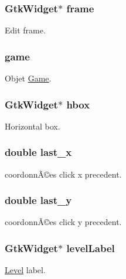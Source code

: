 \subsubsection[{\texorpdfstring{frame}{frame}}]{\setlength{\rightskip}{0pt plus 5cm}Gtk\+Widget$\ast$ frame}\hypertarget{struct_mydata_aa96506ac11851965d0f25b0c9eb53885}{}\label{struct_mydata_aa96506ac11851965d0f25b0c9eb53885}
Edit frame. 
\subsubsection[{\texorpdfstring{game}{game}}]{ game}\hypertarget{struct_mydata_ac6a5ed6191fcf3a5bf0445921feb4f48}{}\label{struct_mydata_ac6a5ed6191fcf3a5bf0445921feb4f48}
Objet \hyperlink{struct_game}{Game}. 
\subsubsection[{\texorpdfstring{hbox}{hbox}}]{\setlength{\rightskip}{0pt plus 5cm}Gtk\+Widget$\ast$ hbox}\hypertarget{struct_mydata_a1eed6d0ed7438018e0d938fce66d265d}{}\label{struct_mydata_a1eed6d0ed7438018e0d938fce66d265d}
Horizontal box. 
\subsubsection[{\texorpdfstring{last\+\_\+x}{last_x}}]{\setlength{\rightskip}{0pt plus 5cm}double last\+\_\+x}\hypertarget{struct_mydata_abb66b33c1e9a8a118c99e73d77ed512c}{}\label{struct_mydata_abb66b33c1e9a8a118c99e73d77ed512c}
coordonnÃ©es click x precedent. 
\subsubsection[{\texorpdfstring{last\+\_\+y}{last_y}}]{\setlength{\rightskip}{0pt plus 5cm}double last\+\_\+y}\hypertarget{struct_mydata_a58471f12beade2e129004d30fe0892c1}{}\label{struct_mydata_a58471f12beade2e129004d30fe0892c1}
coordonnÃ©es click y precedent. 
\subsubsection[{\texorpdfstring{level\+Label}{levelLabel}}]{\setlength{\rightskip}{0pt plus 5cm}Gtk\+Widget$\ast$ level\+Label}\hypertarget{struct_mydata_a27bc5fb5d105194b992c82a95d408222}{}\label{struct_mydata_a27bc5fb5d105194b992c82a95d408222}
\hyperlink{struct_level}{Level} label. 
